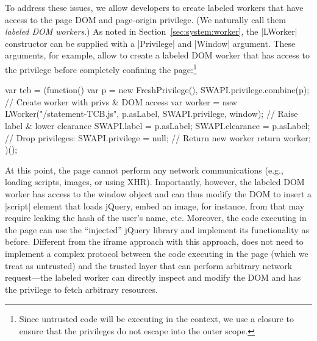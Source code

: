 To address these issues, we allow developers to create labeled workers that
have access to the page DOM and page-origin privilege.
%
(We naturally call them \emph{labeled DOM workers}.)
%
As noted in Section~\ref{sec:system:worker}, the \js|LWorker|
constructor can be supplied with a \js|Privilege| and \js|Window|
argument.
%
These arguments, for example, allow  to create a labeled DOM
worker that has access to the  privilege before completely
confining the page:\footnote{
  Since untrusted code will be executing in the context, we use a
  closure to ensure that the privileges do not escape into the outer
  scope.
}
\begin{jscode}
var tcb =
  (function() {
    var p = new FreshPrivilege(),
    SWAPI.privilege.combine(p);
    // Create worker with privs & DOM access
    var worker = new LWorker("/statement-TCB.js",
                             p.asLabel, SWAPI.privilege, window);
    // Raise label & lower clearance
    SWAPI.label = p.asLabel;
    SWAPI.clearance = p.asLabel;
    // Drop privileges:
    SWAPI.privilege = null;
    // Return new worker
    return worker;
  })();
\end{jscode}
%
%
At this point, the page cannot perform any network communications
(e.g., loading scripts, images, or using XHR).
%
Importantly, however, the labeled DOM worker has access to the window
object and can thus modify the DOM to insert a \js|script| element
that loads jQuery, embed an image, for instance, from
 that may require leaking the hash of the user's
name, etc.
%
Moreover, the code executing in the page can use the ``injected''
jQuery library and implement its functionality as before.
%
Different from the iframe approach with this approach, 
does not need to implement a complex protocol between the code
executing in the page (which we treat as untrusted) and the trusted
layer that can perform arbitrary network request---the labeled worker
can directly inspect and modify the DOM and has the privilege to fetch
arbitrary resources.

